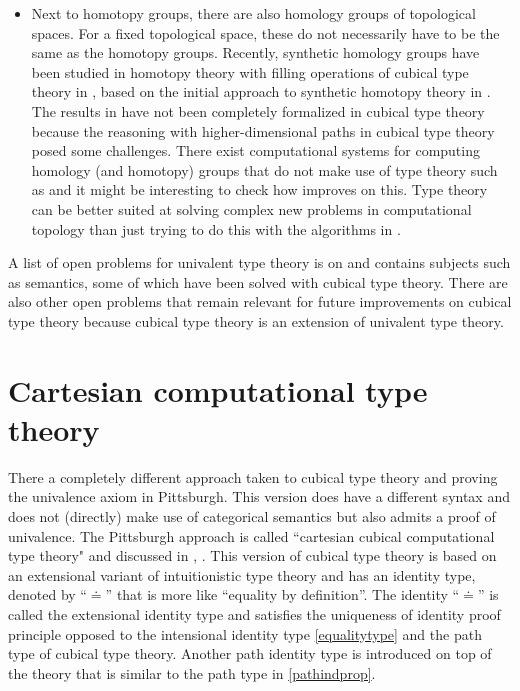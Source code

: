 \documentclass[12pt,a4paper,twoside,xetex]{book} %
\begin{document}
\begin{itemize}
\item Next to homotopy groups, there are also homology groups of topological 
spaces. For a fixed topological space, these do not necessarily have to be the 
same as the homotopy groups. Recently, synthetic homology groups have  been 
studied in homotopy theory with filling operations of cubical type theory in 
\cite{Graham2018}, based on the initial approach to synthetic homotopy theory in 
\cite{Licata2015}. The results in \cite{Graham2018} have not been completely 
formalized in cubical type theory because the reasoning with higher-dimensional 
paths in cubical type theory posed some challenges. There exist computational 
systems for computing homology  (and homotopy) groups that do not make use of 
type theory such as \cite{GaSeSi99} and it might be interesting to check how 
\cite{Graham2018} improves on this. Type theory can be better suited at solving 
complex new problems in computational topology than just trying to do this with 
the algorithms in \cite{GaSeSi99}.
\end{itemize}

A list of open problems for univalent type theory is on \cite{Awodey2019} and 
contains subjects such as semantics, some of which have been solved with cubical 
type theory. There are also other open problems that remain relevant for future 
improvements on cubical type theory because cubical type theory is an extension 
of univalent type theory.





\section{Cartesian computational type theory}\label{comptt}

There a completely different approach taken to cubical type theory and proving the univalence axiom in Pittsburgh. This version does have a different syntax and does not (directly) make use of categorical semantics but also admits a proof of univalence. The Pittsburgh approach is called ``cartesian cubical computational type theory" and discussed in  \cite{Angiuli2017}, \cite{Angiuli2018}. This version of 
cubical type theory is based on an extensional variant of intuitionistic type 
theory and has an identity type, denoted by ``$\doteq$'' that is more 
like ``equality by definition''. The identity ``$\doteq$'' is called the extensional identity type and satisfies the uniqueness of identity proof principle opposed to the intensional identity type \cref{equalitytype} and the path type of cubical type theory. Another path identity 
type is introduced on top of the theory that is similar to the path type in \cref{pathindprop}. 
\end{document}
